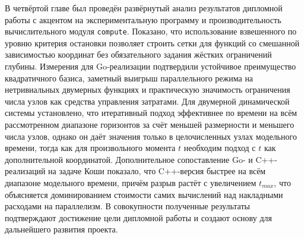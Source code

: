 В четвёртой главе был проведён развёрнутый анализ результатов дипломной работы с акцентом на экспериментальную программу и производительность вычислительного модуля \texttt{compute}. Показано, что использование взвешенного по уровню критерия остановки позволяет строить сетки для функций со смешанной зависимостью координат без обязательного задания жёстких ограничений глубины. Измерения для Go-реализации подтвердили устойчивое преимущество квадратичного базиса, заметный выигрыш параллельного режима на нетривиальных двумерных функциях и практическую значимость ограничения числа узлов как средства управления затратами. Для двумерной динамической системы установлено, что итеративный подход эффективнее по времени на всём рассмотренном диапазоне горизонтов за счёт меньшей размерности и меньшего числа узлов, однако он даёт значения только в целочисленных узлах модельного времени, тогда как для произвольного момента $t$ необходим подход с $t$ как дополнительной координатой. Дополнительное сопоставление Go- и C++-реализаций на задаче Коши показало, что C++-версия быстрее на всём диапазоне модельного времени, причём разрыв растёт с увеличением $t_{max}$, что объясняется доминированием стоимости самих вычислений над накладными расходами на параллелизм. В совокупности полученные результаты подтверждают достижение цели дипломной работы и создают основу для дальнейшего развития проекта.
